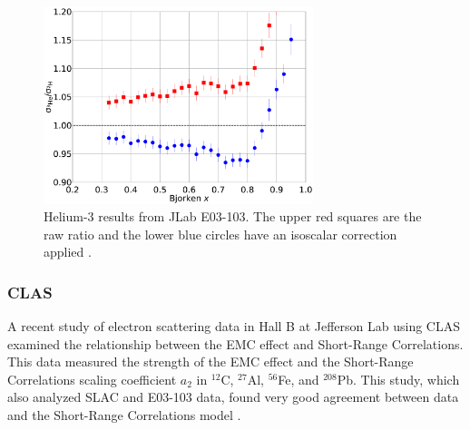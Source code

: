 \begin{figure}
\begin{center}
	\includegraphics[width=0.7\textwidth]{./EMC/fig/seely.eps}
	\caption{Helium-3 results from JLab E03-103. The upper red squares are the raw ratio and the lower blue circles have an isoscalar correction applied \cite{e03103}.}
	\label{seely_3he}
\end{center}
\end{figure}

\subsubsection{CLAS}

A recent study of electron scattering data in Hall B at Jefferson Lab using CLAS examined the relationship between the EMC effect and Short-Range Correlations. This data measured the strength of the EMC effect and the Short-Range Correlations scaling coefficient $a_2$ in $^{12}$C, $^{27}$Al, $^{56}$Fe, and $^{208}$Pb. This study, which also analyzed SLAC and E03-103 data, found very good agreement between data and the Short-Range Correlations model \cite{clas_emc}.